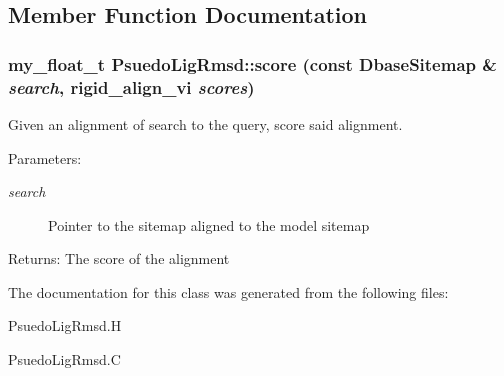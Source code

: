\subsection{Member Function Documentation}
\subsubsection{\setlength{\rightskip}{0pt plus 5cm}my\_\-float\_\-t Psuedo\-Lig\-Rmsd::score (const \bf{Dbase\-Sitemap} \& {\em search}, rigid\_\-align\_\-vi {\em scores})\hspace{0.3cm}{\tt  [protected]}}\label{classSimSite3D_1_1PsuedoLigRmsd_889f9461ef48612a4d146c4b7c34b46c}


Given an alignment of search to the query, score said alignment. 

\begin{Desc}
\item[Parameters:]
\begin{description}
\item[{\em search}]Pointer to the sitemap aligned to the model sitemap \end{description}
\end{Desc}
\begin{Desc}
\item[Returns:]The score of the alignment \end{Desc}


The documentation for this class was generated from the following files:\begin{CompactItemize}
\item 
Psuedo\-Lig\-Rmsd.H\item 
Psuedo\-Lig\-Rmsd.C\end{CompactItemize}
